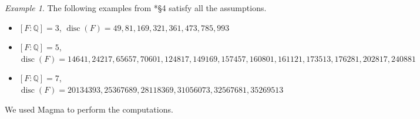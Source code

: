 \documentclass{amsart}
\numberwithin{equation}{subsection}
\numberwithin{theorem}{section}
\theoremstyle{definition}
\theoremstyle{remark}
\newtheorem{example}[theorem]{Example}
\newcommand{\bQ}{\mathbb{Q}}
\DeclareMathOperator{\disc}{disc}
\begin{document}
\begin{example} \label{examples}
    The following examples from \cite{MR2476577}*{\S4} satisfy all the assumptions. 
    \begin{itemize}
        \item $[F:\bQ] = 3$, $\disc(F) = 49, 81, 169, 321, 361, \allowbreak 473, 785, 993$
        \item $[F:\bQ] = 5$, $\disc(F) = 14641, 24217, 65657, 70601, 124817, 149169, 157457, 160801, 161121, \allowbreak 173513, \allowbreak 176281, 202817, 240881$
        \item $[F:\bQ] = 7$, $\disc(F) = 20134393, 25367689, 28118369, 31056073, 32567681, 35269513$
    \end{itemize}
    We used Magma \cite{MR1484478} to perform the computations.
\end{example}



\end{document}
